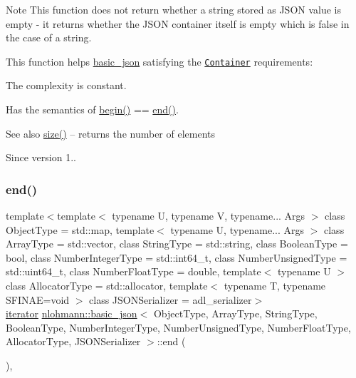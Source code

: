 \begin{DoxyNote}{Note}
This function does not return whether a string stored as J\+S\+ON value is empty -\/ it returns whether the J\+S\+ON container itself is empty which is false in the case of a string.
\end{DoxyNote}
This function helps {\ttfamily \mbox{\hyperlink{classnlohmann_1_1basic__json}{basic\+\_\+json}}} satisfying the \href{http://en.cppreference.com/w/cpp/concept/Container}{\tt Container} requirements\+:
\begin{DoxyItemize}
\item The complexity is constant.
\item Has the semantics of {\ttfamily \mbox{\hyperlink{classnlohmann_1_1basic__json_a0ff28dac23f2bdecee9564d07f51dcdc}{begin()}} == \mbox{\hyperlink{classnlohmann_1_1basic__json_a13e032a02a7fd8a93fdddc2fcbc4763c}{end()}}}.
\end{DoxyItemize}

\begin{DoxySeeAlso}{See also}
\mbox{\hyperlink{classnlohmann_1_1basic__json_a25e27ad0c6d53c01871c5485e1f75b96}{size()}} -- returns the number of elements
\end{DoxySeeAlso}
\begin{DoxySince}{Since}
version 1.. 
\end{DoxySince}
\mbox{\label{classnlohmann_1_1basic__json_a13e032a02a7fd8a93fdddc2fcbc4763c}} 
\subsubsection{\texorpdfstring{end()}{end()}\hspace{0.1cm}{\footnotesize\ttfamily [1/2]}}
{\footnotesize\ttfamily template$<$template$<$ typename U, typename V, typename... Args $>$ class Object\+Type = std\+::map, template$<$ typename U, typename... Args $>$ class Array\+Type = std\+::vector, class String\+Type  = std\+::string, class Boolean\+Type  = bool, class Number\+Integer\+Type  = std\+::int64\+\_\+t, class Number\+Unsigned\+Type  = std\+::uint64\+\_\+t, class Number\+Float\+Type  = double, template$<$ typename U $>$ class Allocator\+Type = std\+::allocator, template$<$ typename T, typename S\+F\+I\+N\+A\+E=void $>$ class J\+S\+O\+N\+Serializer = adl\+\_\+serializer$>$ \\
\mbox{\hyperlink{classnlohmann_1_1basic__json_a099316232c76c034030a38faa6e34dca}{iterator}} \mbox{\hyperlink{classnlohmann_1_1basic__json}{nlohmann\+::basic\+\_\+json}}$<$ Object\+Type, Array\+Type, String\+Type, Boolean\+Type, Number\+Integer\+Type, Number\+Unsigned\+Type, Number\+Float\+Type, Allocator\+Type, J\+S\+O\+N\+Serializer $>$\+::end (\begin{DoxyParamCaption}{ }\end{DoxyParamCaption})\hspace{0.3cm}{\ttfamily [inline]}, {\ttfamily [noexcept]}}



